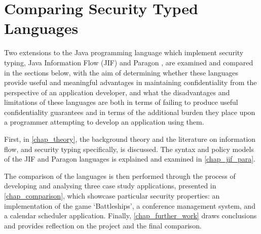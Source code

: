\section{Comparing Security Typed Languages}

Two extensions to the Java programming language which implement security typing, Java Information Flow (JIF) \cite{jifwebsite} and Paragon \cite{parawebsite}, are examined and compared in the sections below, with the aim of determining whether these languages provide useful and meaningful advantages in maintaining confidentiality from the perspective of an application developer, and what the disadvantages and limitations of these languages are both in terms of failing to produce useful confidentiality guarantees and in terms of the additional burden they place upon a programmer attempting to develop an application using them.

First, in \autoref{chap_theory}, the background theory and the literature on information flow, and security typing specifically, is discussed. The syntax and policy models of the JIF and Paragon languages is explained and examined in \autoref{chap_jif_para}.

The comparison of the languages is then performed through the process of developing and analysing three case study applications, presented in \autoref{chap_comparison}, which showcase particular security properties: an implementation of the game `Battleships', a conference management system, and a calendar scheduler application. Finally, \autoref{chap_further_work} draws conclusions and provides reflection on the project and the final comparison.